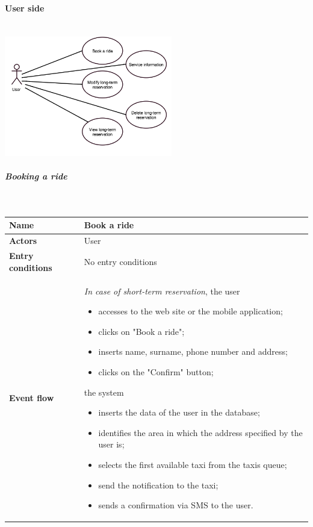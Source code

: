 \newpage
\paragraph{User side}
	\begin{center}
	~\\
\includegraphics[width=0.55\textwidth]{./images/UseCaseUser.png}~
	\end{center}
\subparagraph{Booking a ride}
~\\[0.2cm]
	\vspace{20pt}
\noindent
\begin{tabular}{l l}
 \textbf {Name} & Book a ride  \\ \hline
 \textbf{Actors} & User \\ \hline
 \textbf{Entry conditions} & No entry conditions \\ \hline
 \textbf{Event flow} & 
 \parbox{0.7\textwidth}{
 \emph{In case of short-term reservation}, the user
 \begin{itemize}
 \item accesses to the web site or the mobile application;
 \item clicks on "Book a ride";
 \item inserts name, surname, phone number and address;
 \item clicks on the "Confirm" button;
 \end{itemize}
 the system
 \begin{itemize}
 \item inserts the data of the user in the database;
 \item identifies the area in which the address specified by the user is;
 \item selects the first available taxi from the taxis queue;
 \item send the notification to the taxi;
 \item sends a confirmation via SMS to the user.
 \end{itemize}
  }
 \end{tabular}
